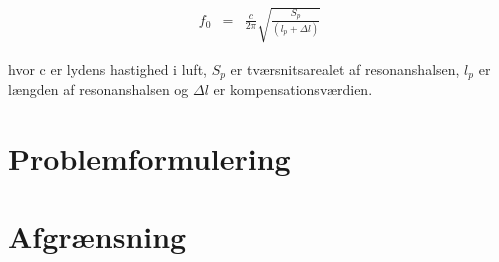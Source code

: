 \begin{eqnarray}
f_{0}&=&\frac{c}{2\pi}\sqrt{\frac{S_{p}}{\left(l_{p}+\Delta l\right)}}
\end{eqnarray}

hvor c er lydens hastighed i luft, $S_{p}$ er tværsnitsarealet af resonanshalsen, $l_{p}$ er længden af resonanshalsen og $\Delta l$ er kompensationsværdien. 




\section{Problemformulering}

\section{Afgrænsning}

